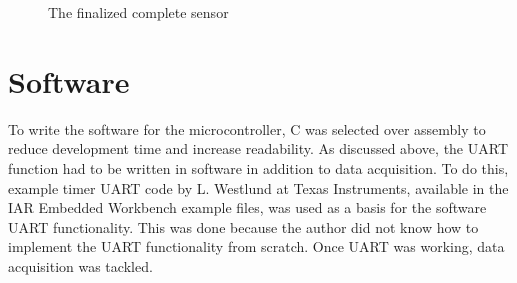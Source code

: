 \begin{figure}[htp]
\centering
{}
\caption[Finalized Sensor Prototype]{The finalized complete sensor}
\end{figure}

\section{Software}

To write the software for the microcontroller, C was selected over assembly to reduce development time and increase readability. As discussed above, the UART function had to be written in software in addition to data acquisition. To do this, example timer UART code by L. Westlund at Texas Instruments, available in the IAR Embedded Workbench example files, was used as a basis for the software UART functionality. This was done because the author did not know how to implement the UART functionality from scratch. Once UART was working, data acquisition was tackled.

